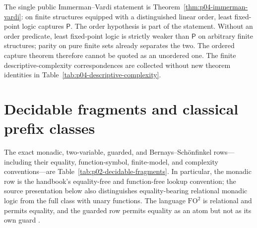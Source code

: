 The single public Immerman--Vardi statement is
Theorem~\ref{thm:p04-immerman-vardi}: on finite structures equipped with a
distinguished linear order, least fixed-point logic captures \(\mathsf P\).
The order hypothesis is part of the statement.  Without an order predicate,
least fixed-point logic is strictly weaker than \(\mathsf P\) on arbitrary
finite structures; parity on pure finite sets already separates the two.  The
ordered capture theorem therefore cannot be quoted as an unordered one.
The finite descriptive-complexity correspondences are collected without new
theorem identities in Table~\ref{tab:p04-descriptive-complexity}.






\section{Decidable fragments and classical prefix classes}
\label{sec:p09-decidable-fragments}

The exact monadic, two-variable, guarded, and
Bernays--Sch\"onfinkel rows---including their equality, function-symbol,
finite-model, and complexity conventions---are
Table~\ref{tab:p02-decidable-fragments}.  In particular, the monadic row is
the handbook's equality-free and function-free lookup convention; the source
presentation below also distinguishes equality-bearing relational monadic
logic from the full class with unary functions.  The language \(\mathrm{FO}^{2}\)
is relational and permits
equality, and the guarded row permits equality as an atom but not as its own
guard \cite{Behmann1922,Mortimer1975,AndrekaVanBenthemNemeti1998,
GradelKolaitisVardi1997,Gradel1999}.

